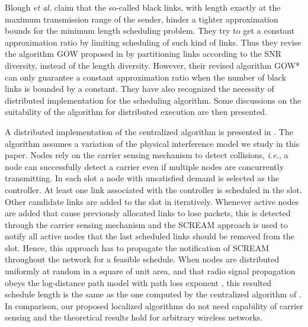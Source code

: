\documentclass[journal]{IEEEtran}
\begin{document}
Blough \emph{et al.} \cite{S:phy17} claim that the so-called black links, with length exactly at the maximum transmission range of the sender, hinder a tighter approximation bounds for the minimum length scheduling problem. They try to get a constant approximation ratio by limiting scheduling of such kind of links. Thus they revise the algorithm GOW proposed in \cite{S:phy1} by partitioning links according to the SNR diversity, instead of the length diversity. However, their revised algorithm GOW* can only guarantee a constant approximation ratio when the number of black links is bounded by a constant. They have also recognized the necessity of distributed implementation for the scheduling algorithm. Some discussions on the suitability of the algorithm for distributed execution are then presented.

A distributed implementation of the centralized algorithm \cite{Brar-mobicom06} is presented in \cite{brar-icdcs08}. The algorithm assumes a variation of the physical interference model we study in this paper. Nodes rely on the carrier sensing mechanism to detect collisions, \emph{i.e.}, a node can successfully detect a carrier even if multiple nodes are concurrently transmitting. In each slot a node with unsatisfied demand is selected as the controller. At least one link associated with the controller is scheduled in the slot. Other candidate links are added to the slot in iteratively. Whenever active nodes are added that cause previously allocated links to lose packets, this is detected through the carrier sensing mechanism and the SCREAM approach is used to notify all active nodes that the last scheduled links should be removed from the slot. Hence, this approach has to propagate the notification of SCREAM throughout the network for a feasible schedule.
When nodes are distributed uniformly at random in a square of unit area, and that radio signal propagation obeys the log-distance path model with path loss exponent , this resulted schedule length is the same as the one computed by the centralized algorithm of \cite{Brar-mobicom06}. In comparison, our proposed localized algorithms  do not need capability of carrier sensing and the theoretical results hold for arbitrary wireless networks.
\end{document}
